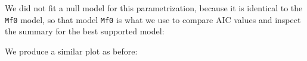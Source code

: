 \documentclass[12pt,]{book}
\newenvironment{Shaded}{\begin{snugshade}}{\end{snugshade}}
\newcommand{\DecValTok}[1]{\textcolor[rgb]{0.00,0.00,0.81}{#1}}
\newcommand{\KeywordTok}[1]{\textcolor[rgb]{0.13,0.29,0.53}{\textbf{#1}}}
\newcommand{\NormalTok}[1]{#1}
\newcommand{\OperatorTok}[1]{\textcolor[rgb]{0.81,0.36,0.00}{\textbf{#1}}}
\newcommand{\StringTok}[1]{\textcolor[rgb]{0.31,0.60,0.02}{#1}}
\begin{document}
We did not fit a null model for this parametrization, because it is identical to the \texttt{Mf0} model,
so that model \texttt{Mf0} is what we use to compare AIC values and inspect the summary for the best
supported model:

\begin{Shaded}
\end{Shaded}

We produce a similar plot as before:
\end{document}
